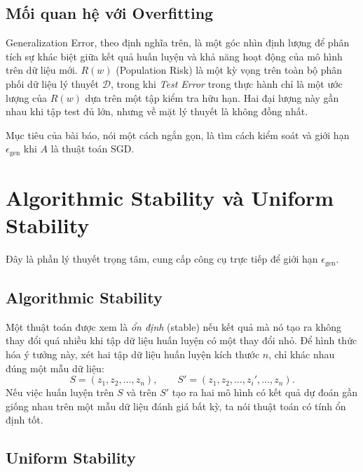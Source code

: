 \subsection{Mối quan hệ với Overfitting}

Generalization Error, theo định nghĩa trên, là một góc nhìn định lượng để phân tích sự khác biệt giữa kết quả huấn luyện và khả năng hoạt động của mô hình trên dữ liệu mới. $R(w)$ (Population Risk) là một kỳ vọng trên toàn bộ phân phối dữ liệu lý thuyết $\mathcal{D}$, trong khi \textit{Test Error} trong thực hành chỉ là một ước lượng của $R(w)$ dựa trên một tập kiểm tra hữu hạn. Hai đại lượng này gần nhau khi tập test đủ lớn, nhưng về mặt lý thuyết là không đồng nhất.

Mục tiêu của bài báo, nói một cách ngắn gọn, là tìm cách kiểm soát và giới hạn $\epsilon_{\mathrm{gen}}$ khi $A$ là thuật toán SGD.

\section{Algorithmic Stability và Uniform Stability}
\label{sec:stability}

Đây là phần lý thuyết trọng tâm, cung cấp công cụ trực tiếp để giới hạn $\epsilon_{\mathrm{gen}}$.

\subsection{Algorithmic Stability}

Một thuật toán được xem là \textit{ổn định} (stable) nếu kết quả mà nó tạo ra không thay đổi quá nhiều khi tập dữ liệu huấn luyện có một thay đổi nhỏ. Để hình thức hóa ý tưởng này, xét hai tập dữ liệu huấn luyện kích thước $n$, chỉ khác nhau đúng một mẫu dữ liệu:
\[
S = (z_1, z_2, \ldots, z_n), \qquad S' = (z_1, z_2, \ldots, z_i', \ldots, z_n).
\]
Nếu việc huấn luyện trên $S$ và trên $S'$ tạo ra hai mô hình có kết quả dự đoán gần giống nhau trên một mẫu dữ liệu đánh giá bất kỳ, ta nói thuật toán có tính ổn định tốt.

\subsection{Uniform Stability}

